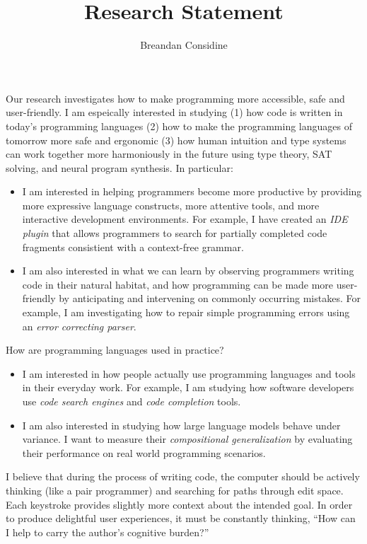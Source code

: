 \documentclass[11pt]{article}
\begin{document}
    \title{Research Statement}
    \author{Breandan Considine}
    \maketitle
    Our research investigates how to make programming more accessible, safe and user-friendly. I am espeically interested in studying (1) how code is written in today's programming languages (2) how to make the programming languages of tomorrow more safe and ergonomic (3) how human intuition and type systems can work together more harmoniously in the future using type theory, SAT solving, and neural program synthesis. In particular:\\

    \begin{itemize}
        \item I am interested in helping programmers become more productive by providing more expressive language constructs, more attentive tools, and more interactive development environments. For example, I have created an \emph{IDE plugin} that allows programmers to search for partially completed code fragments consistient with a context-free grammar.
        \item I am also interested in what we can learn by observing programmers writing code in their natural habitat, and how programming can be made more user-friendly by anticipating and intervening on commonly occurring mistakes. For example, I am investigating how to repair simple programming errors using an \textit{error correcting parser}.
    \end{itemize}

    \noindent How are programming languages used in practice? \\

    \begin{itemize}
        \item I am interested in how people actually use programming languages and tools in their everyday work. For example, I am studying how software developers use \emph{code search engines} and \emph{code completion} tools.
        \item I am also interested in studying how large language models behave under variance. I want to measure their \textit{compositional generalization} by evaluating their performance on real world programming scenarios.
    \end{itemize}

    I believe that during the process of writing code, the computer should be actively thinking (like a pair programmer) and searching for paths through edit space. Each keystroke provides slightly more context about the intended goal. In order to produce delightful user experiences, it must be constantly thinking, ``How can I help to carry the author's cognitive burden?''\\
\end{document}
